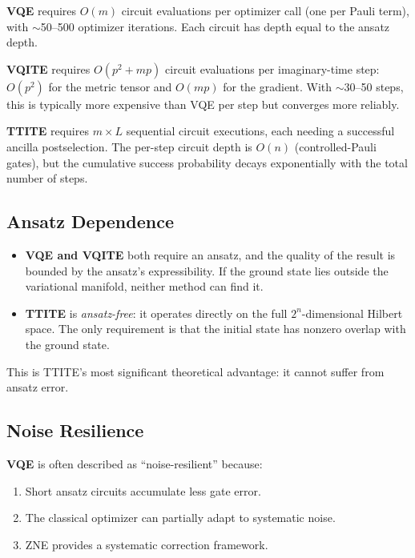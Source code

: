 \documentclass[11pt,a4paper]{article}
\begin{document}
\textbf{VQE} requires $O(m)$ circuit evaluations per optimizer call (one per
Pauli term), with $\sim$50--500 optimizer iterations.  Each circuit has depth
equal to the ansatz depth.

\textbf{VQITE} requires $O(p^2 + mp)$ circuit evaluations per imaginary-time
step: $O(p^2)$ for the metric tensor and $O(mp)$ for the gradient.  With
$\sim$30--50 steps, this is typically more expensive than VQE per step but
converges more reliably.

\textbf{TTITE} requires $m \times L$ sequential circuit executions, each
needing a successful ancilla postselection.  The per-step circuit depth
is $O(n)$ (controlled-Pauli gates), but the cumulative success probability
decays exponentially with the total number of steps.

\subsection{Ansatz Dependence}

\begin{itemize}[nosep]
  \item \textbf{VQE and VQITE} both require an ansatz, and the quality of
    the result is bounded by the ansatz's expressibility.  If the ground
    state lies outside the variational manifold, neither method can find it.
  \item \textbf{TTITE} is \emph{ansatz-free}: it operates directly on the
    full $2^n$-dimensional Hilbert space.  The only requirement is that the
    initial state has nonzero overlap with the ground state.
\end{itemize}

This is TTITE's most significant theoretical advantage: it cannot suffer
from ansatz error.

\subsection{Noise Resilience}

\textbf{VQE} is often described as ``noise-resilient'' because:
\begin{enumerate}[nosep]
  \item Short ansatz circuits accumulate less gate error.
  \item The classical optimizer can partially adapt to systematic noise.
  \item ZNE provides a systematic correction framework.
\end{enumerate}
\end{document}
